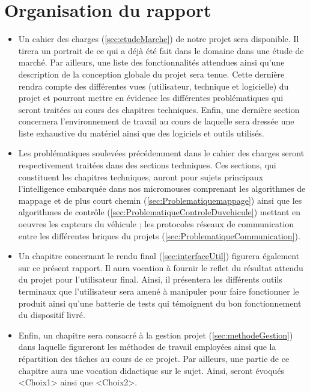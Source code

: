 \section{Organisation du rapport} \label{sec:organisation}

\begin{itemize}
	\item Un cahier des charges (\ref{sec:etudeMarche}) de notre projet sera disponible. Il tirera un portrait 
de ce qui a déjà été fait dans le domaine dans une étude de marché. Par ailleurs, 
une liste des fonctionnalités attendues ainsi qu'une description de la conception 
globale du projet sera tenue. Cette dernière rendra compte des différentes vues 
(utilisateur, technique et logicielle) du projet et pourront mettre en évidence les 
différentes problématiques qui seront traitées au cours des chapitres techniques. 
Enfin, une dernière section concernera l'environnement de travail au cours de laquelle 
sera dressée une liste exhaustive du matériel ainsi que des logiciels et outils utilisés.\\


	\item Les problématiques soulevées précédemment dans le cahier des charges seront 
respectivement traitées dans des sections techniques. Ces sections, qui constituent 
les chapitres techniques, auront pour sujets principaux l'intelligence embarquée dans 
nos micromouses comprenant les algorithmes de mappage et de plus court chemin (\ref{sec:Problematiquemappage}) ainsi 
que les algorithmes de contrôle (\ref{sec:ProblematiqueControleDuvehicule}) mettant 
en oeuvres les capteurs du véhicule ; les protocoles réseaux de communication entre 
les différentes briques du projets (\ref{sec:ProblematiqueCommunication}). \\


	\item Un chapitre concernant le rendu final (\ref{sec:interfaceUtil}) figurera également sur ce présent rapport. 
Il aura vocation à fournir le reflet du résultat attendu du projet pour l'utilisateur 
final. Ainsi, il présentera les différents outils terminaux que l'utilisateur sera amené 
à manipuler pour faire fonctionner le produit ainsi qu'une batterie de tests qui témoignent 
du bon fonctionnement du dispositif livré. \\


	\item Enfin, un chapitre sera consacré à la gestion projet (\ref{sec:methodeGestion}) dans laquelle figureront les méthodes 
de travail employées ainsi que la répartition des tâches au cours de ce projet. 
Par ailleurs, une partie de ce chapitre aura une vocation didactique sur le sujet. 
Ainsi, seront évoqués <Choix1> ainsi que <Choix2>. \\
\end{itemize}
